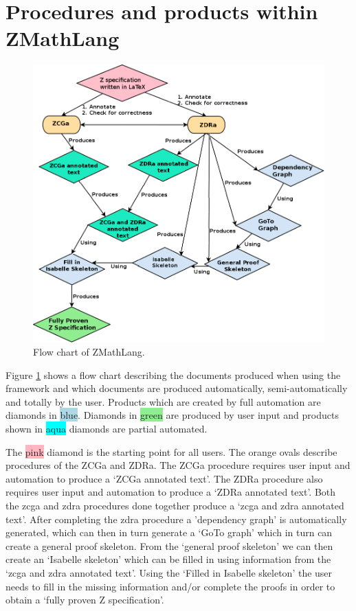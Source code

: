 \section{Procedures and products within ZMathLang}

\begin{figure}[H]
 \begin{center}
 \includegraphics [scale=0.4]{Figures/Design/ZMathLangFlow.png}
 \caption{Flow chart of ZMathLang.}
 \label{fig:zmathflow}
\end{center}
\end{figure} 

Figure \ref{fig:zmathflow} shows a flow chart describing the documents produced when using the framework and which documents are produced automatically, semi-automatically and totally by the user. Products which are created by full automation are diamonds in \colorbox{lightblue}{blue}. Diamonds in \colorbox{lightgreen}{green} are produced by user input and products shown in \colorbox{aqua}{aqua} diamonds are partial automated.

The \colorbox{lightpink}{pink} diamond is the starting point for all users. The \colorbox{lightorange}{orange} ovals describe procedures of the ZCGa and ZDRa. The ZCGa procedure requires user input and automation to produce a `ZCGa annotated text'. The ZDRa procedure also requires user input and automation to produce a `ZDRa annotated text'. Both the \gls{zcga} and \gls{zdra} procedures done together produce a `\gls{zcga} and \gls{zdra} annotated text'. After completing the \gls{zdra} procedure a 'dependency graph' is automatically generated, which can then in turn generate a `GoTo graph' which in turn can create a general proof skeleton. From the `general proof skeleton' we can then create an `Isabelle skeleton'  which can be filled in using information from the `\gls{zcga} and \gls{zdra} annotated text'. Using the `Filled in Isabelle skeleton' the user needs to fill in the missing information and/or complete the proofs in order to obtain a `fully proven Z specification'.

